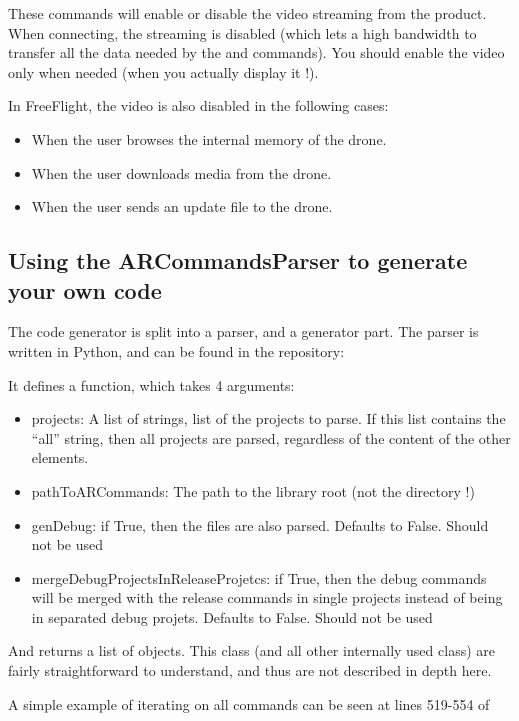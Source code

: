These commands will enable or disable the video streaming from the product. When connecting, the streaming is disabled (which lets a high bandwidth to transfer all the data needed by the  and  commands). You should enable the video only when needed (when you actually display it !).

In FreeFlight, the video is also disabled in the following cases:
\begin{itemize}
\item{When the user browses the internal memory of the drone.}
\item{When the user downloads media from the drone.}
\item{When the user sends an update file to the drone.}
\end{itemize}


\subsection{Using the ARCommandsParser to generate your own code}

The code generator is split into a parser, and a generator part. The parser is written in Python, and can be found in the  repository:

It defines a  function, which takes 4 arguments:
\begin{itemize}
\item{projects: A list of strings, list of the projects to parse. If this list contains the ``all'' string, then all projects are parsed, regardless of the content of the other elements.}
\item{pathToARCommands: The path to the  library root (not the  directory !)}
\item{genDebug: if True, then the  files are also parsed. Defaults to False. Should not be used}
\item{mergeDebugProjectsInReleaseProjetcs: if True, then the debug commands will be merged with the release commands in single projects instead of being in separated debug projets. Defaults to False. Should not be used}
\end{itemize}

And returns a list of  objects. This class (and all other internally used class) are fairly straightforward to understand, and thus are not described in depth here.

A simple example of iterating on all commands can be seen at lines 519-554 of 


